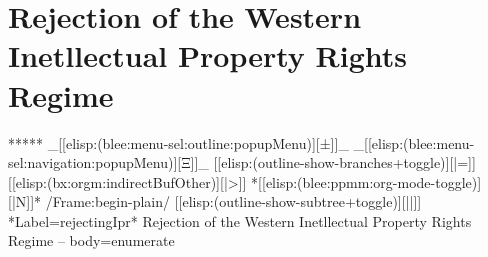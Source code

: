 \section{Rejection of the Western Inetllectual Property Rights Regime}


\begin{whenOrg}
*****  _[[elisp:(blee:menu-sel:outline:popupMenu)][±]]_ _[[elisp:(blee:menu-sel:navigation:popupMenu)][Ξ]]_ [[elisp:(outline-show-branches+toggle)][|=]] [[elisp:(bx:orgm:indirectBufOther)][|>]] *[[elisp:(blee:ppmm:org-mode-toggle)][|N]]*  /Frame:begin-plain/ [[elisp:(outline-show-subtree+toggle)][||]] *Label=rejectingIpr* Rejection of the Western Inetllectual Property Rights Regime -- body=enumerate
\end{whenOrg}

